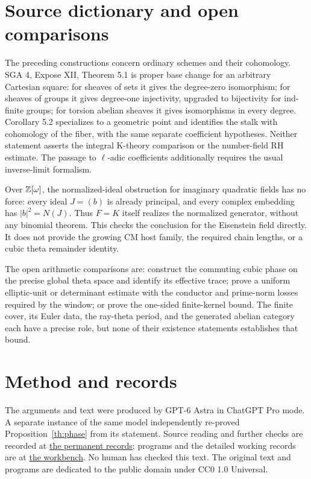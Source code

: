 \documentclass[11pt]{article}
\theoremstyle{remark}\newtheorem{remark}[theorem]{Remark}
\newcommand{\workbenchurl}{https://github.com/KokunoYumeto/zeta-and-l-functions-workbench}
\newcommand{\recordurl}{https://github.com/KokunoYumeto/mathematics-workbenches}
\begin{document}
\section{Source dictionary and open comparisons}
The preceding constructions concern ordinary schemes and their cohomology. SGA 4, Expose XII, Theorem 5.1 is proper base change for an arbitrary Cartesian square: for sheaves of sets it gives the degree-zero isomorphism; for sheaves of groups it gives degree-one injectivity, upgraded to bijectivity for ind-finite groups; for torsion abelian sheaves it gives isomorphisms in every degree. Corollary 5.2 specializes to a geometric point and identifies the stalk with cohomology of the fiber, with the same separate coefficient hypotheses. Neither statement asserts the integral K-theory comparison or the number-field RH estimate. The passage to $\ell$-adic coefficients additionally requires the usual inverse-limit formalism.

Over $\mathbb Z[\omega]$, the normalized-ideal obstruction for imaginary quadratic fields has no force: every ideal $J=(b)$ is already principal, and every complex embedding has $|b|^2=N(J)$. Thus $F=K$ itself realizes the normalized generator, without any binomial theorem. This checks the conclusion for the Eisenstein field directly. It does not provide the growing CM host family, the required chain lengths, or a cubic theta remainder identity.

The open arithmetic comparisons are: construct the commuting cubic phase on the precise global theta space and identify its effective trace; prove a uniform elliptic-unit or determinant estimate with the conductor and prime-norm losses required by the window; or prove the one-sided finite-kernel bound. The finite cover, its Euler data, the ray-theta period, and the generated abelian category each have a precise role, but none of their existence statements establishes that bound.

\section*{Method and records}
The arguments and text were produced by GPT-6 Astra in ChatGPT Pro mode. A separate instance of the same model independently re-proved Proposition~\ref{th:phase} from its statement. Source reading and further checks are recorded at \href{\recordurl}{the permanent records}; programs and the detailed working records are at \href{\workbenchurl}{the workbench}. No human has checked this text. The original text and programs are dedicated to the public domain under CC0 1.0 Universal.
\end{document}
